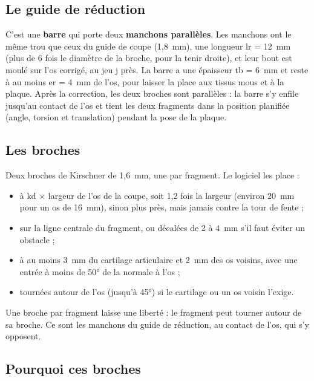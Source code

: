 \documentclass[11pt,a4paper]{article}
\begin{document}
\subsection{Le guide de réduction}

C'est une \textbf{barre} qui porte deux \textbf{manchons parallèles}. Les manchons ont le même trou que ceux du guide de
coupe (1,8~mm), une longueur lr = 12~mm (plus de 6 fois le diamètre de la broche, pour la tenir droite), et leur bout
est moulé sur l'os corrigé, au jeu j près. La barre a une épaisseur tb = 6~mm et reste à au moins er = 4~mm de l'os,
pour laisser la place aux tissus mous et à la plaque. Après la correction, les deux broches sont parallèles : la barre
s'y enfile jusqu'au contact de l'os et tient les deux fragments dans la position planifiée (angle, torsion et
translation) pendant la pose de la plaque.

\subsection{Les broches}

Deux broches de Kirschner de 1,6~mm, une par fragment. Le logiciel les place :
\begin{itemize}
  \item à kd × largeur de l'os de la coupe, soit 1,2 fois la largeur (environ 20~mm pour un os de 16~mm), sinon plus
        près, mais jamais contre la tour de fente ;
  \item sur la ligne centrale du fragment, ou décalées de 2 à 4~mm s'il faut éviter un obstacle ;
  \item à au moins 3~mm du cartilage articulaire et 2~mm des os voisins, avec une entrée à moins de 50° de la normale
        à l'os ;
  \item tournées autour de l'os (jusqu'à 45°) si le cartilage ou un os voisin l'exige.
\end{itemize}
Une broche par fragment laisse une liberté : le fragment peut tourner autour de sa broche. Ce sont les manchons du
guide de réduction, au contact de l'os, qui s'y opposent.

\subsection{Pourquoi ces broches}
\end{document}
